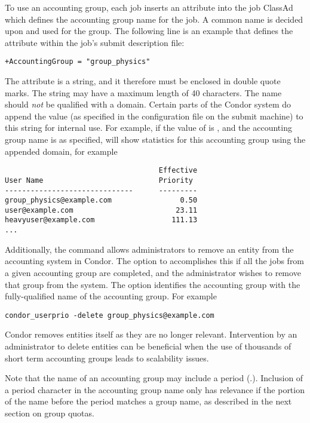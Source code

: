 To use an accounting group,
each job inserts an attribute into the job ClassAd which
defines the accounting group name for the job.
A common name is decided upon and used for the group.
The following line is an example that defines the attribute
within the job's submit description file:
\begin{verbatim}
+AccountingGroup = "group_physics"
\end{verbatim}

The  attribute is a string,
and it therefore must be enclosed in double quote marks.
The string may have a maximum length of 40 characters.
The name should \emph{not} be qualified with a domain.
Certain parts of the Condor system 
do append the value 
(as specified in the configuration file on the submit machine)
to this string for internal use.
For example, if the value of  is
, and the accounting group name
is as specified,
 will show statistics
for this accounting group using the appended domain, for example
\footnotesize
\begin{verbatim}
                                    Effective
User Name                           Priority
------------------------------      ---------
group_physics@example.com                0.50
user@example.com                        23.11
heavyuser@example.com                  111.13
...
\end{verbatim}
\normalsize

Additionally, the  command allows administrators to
remove an entity from the accounting system in Condor.
The  option to 
accomplishes this
if all the jobs from a given accounting group are completed,
and the administrator wishes to remove that group from the system.
The  option
identifies the accounting group with the fully-qualified name
of the accounting group.
For example
\footnotesize
\begin{verbatim}
condor_userprio -delete group_physics@example.com
\end{verbatim}
\normalsize

Condor removes entities itself as they are no longer
relevant.
Intervention by an administrator to delete entities can
be beneficial when the use of thousands
of short term accounting groups leads to scalability
issues.

Note that the name of an accounting group may include a period (.).
Inclusion of a period character in the accounting group name
only has relevance if the portion of the name before the
period matches a group name,
as described in the next section on group quotas.

